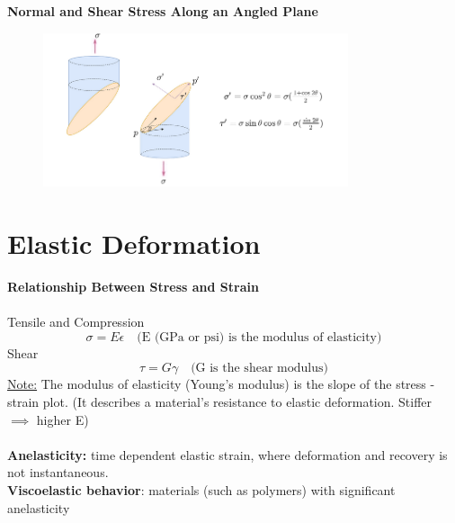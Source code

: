 \documentclass[12pt]{article}
\begin{document}
\noindent \textbf{Normal and Shear Stress Along an Angled Plane}
\begin{figure}[H]
    \centering
    \includegraphics[width=0.8\textwidth]{geometric stress.png}
\end{figure}
\newpage

\section*{Elastic Deformation}
\textbf{Relationship Between Stress and Strain}\\\\
Tensile and Compression
\[\sigma = E\epsilon \quad \text{(E (GPa or psi) is the modulus of elasticity)}\]
Shear
\[\tau = G\gamma \quad \text{(G is the shear modulus)}\]
\underline{Note:} The modulus of elasticity (Young's modulus) is the slope of the stress - strain plot. (It describes a material's resistance to elastic deformation. Stiffer $\implies$ higher E)\\\\
\textbf{Anelasticity:} time dependent elastic strain, where deformation and recovery is not instantaneous.\\
\textbf{Viscoelastic behavior}: materials (such as polymers) with significant anelasticity\\\\
\end{document}
